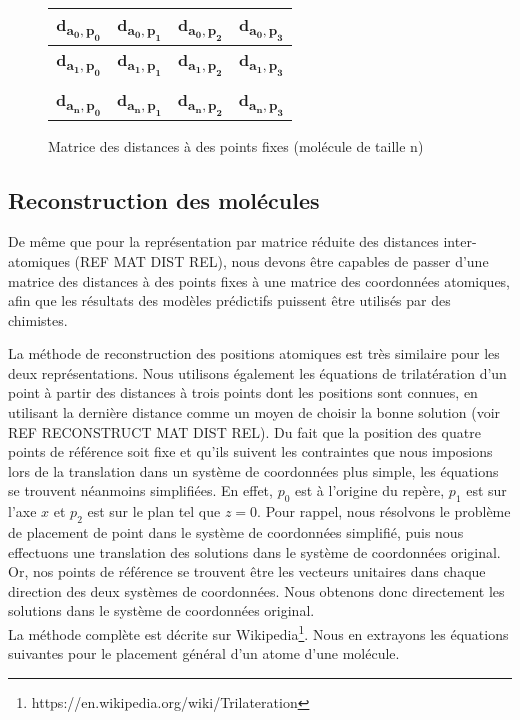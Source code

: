 \begin{figure}[h!]
	\centering
	
	\begin{tabular}{|c|c|c|c|}
		\hline
		\textbf{d\textsubscript{$\mathbf{a_0,p_0}$}} & \textbf{d\textsubscript{$\mathbf{a_0,p_1}$}} & \textbf{d\textsubscript{$\mathbf{a_0,p_2}$}} & \textbf{d\textsubscript{$\mathbf{a_0,p_3}$}} \\ \hline
		\textbf{d\textsubscript{$\mathbf{a_1,p_0}$}} & \textbf{d\textsubscript{$\mathbf{a_1,p_1}$}} & \textbf{d\textsubscript{$\mathbf{a_1,p_2}$}} & \textbf{d\textsubscript{$\mathbf{a_1,p_3}$}} \\ \hline
		\rot{... } & \rot{... } & \rot{... } & \rot{... } \\ \hline
		\textbf{d\textsubscript{$\mathbf{a_n,p_0}$}} & \textbf{d\textsubscript{$\mathbf{a_n,p_1}$}} & \textbf{d\textsubscript{$\mathbf{a_n,p_2}$}} & \textbf{d\textsubscript{$\mathbf{a_n,p_3}$}} \\ \hline
	\end{tabular}
	
	\caption{Matrice des distances à des points fixes (molécule de taille n)}
\end{figure}


\subsection{Reconstruction des molécules}
\par De même que pour la représentation par matrice réduite des distances inter-atomiques (REF MAT DIST REL), nous devons être capables de passer d'une matrice des distances à des points fixes à une matrice des coordonnées atomiques, afin que les résultats des modèles prédictifs puissent être utilisés par des chimistes.\\

\par La méthode de reconstruction des positions atomiques est très similaire pour les deux représentations. Nous utilisons également les équations de trilatération d'un point à partir des distances à trois points dont les positions sont connues, en utilisant la dernière distance comme un moyen de choisir la bonne solution (voir REF RECONSTRUCT MAT DIST REL). Du fait que la position des quatre points de référence soit fixe et qu'ils suivent les contraintes que nous imposions lors de la translation dans un système de coordonnées plus simple, les équations se trouvent néanmoins simplifiées. En effet, $p_0$ est à l'origine du repère, $p_1$ est sur l'axe $x$ et $p_2$ est sur le plan tel que $z=0$. Pour rappel, nous résolvons le problème de placement de point dans le système de coordonnées simplifié, puis nous effectuons une translation des solutions dans le système de coordonnées original. Or, nos points de référence se trouvent être les vecteurs unitaires dans chaque direction des deux systèmes de coordonnées. Nous obtenons donc directement les solutions dans le système de coordonnées original. \\
La méthode complète est décrite sur Wikipedia\footnote{https://en.wikipedia.org/wiki/Trilateration}. Nous en extrayons les équations suivantes pour le placement général d'un atome d'une molécule.

